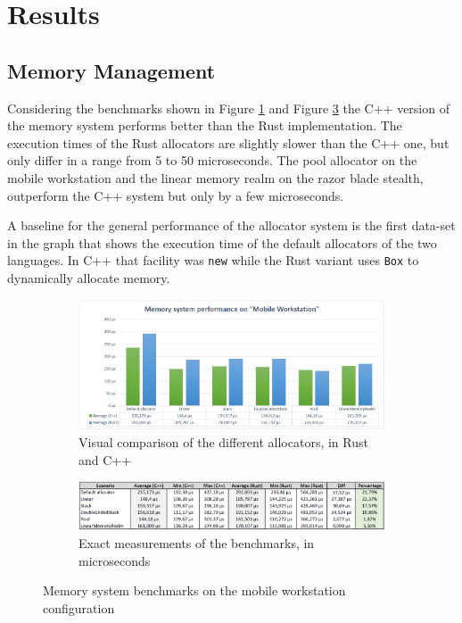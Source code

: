 \clearpage

\section{Results}

\subsection{Memory Management}

Considering the benchmarks shown in Figure \ref{fig:mem_bench_workstation} and Figure \ref{fig:mem_bench_blade} the C++ version of the memory system performs better than the Rust implementation. The execution times of the Rust allocators are slightly slower than the C++ one, but only differ in a range from 5 to 50 microseconds. The pool allocator on the mobile workstation and the linear memory realm on the razor blade stealth, outperform the C++ system but only by a few microseconds. 

A baseline for the general performance of the allocator system is the first data-set in the graph that shows the execution time of the default allocators of the two languages. In C++ that facility was \texttt{new} while the Rust variant uses \texttt{Box} to dynamically allocate memory.

\begin{figure}[h!]
	\centering
	\begin{subfigure}[b]{\textwidth}
		\includegraphics[width=1\linewidth]{PICs/mem_bench_workstation.png}
		\caption{Visual comparison of the different allocators, in Rust and C++}
		\label{fig:mem_bench_workstation} 
	\end{subfigure}
	
	\begin{subfigure}[b]{\textwidth}
		\includegraphics[width=1\linewidth]{PICs/mem_bench_workstation_data.png}
		\caption{Exact measurements of the benchmarks, in microseconds}
		\label{fig:mem_bench_blade}
	\end{subfigure}
	
	\caption[Memory benchmarks workstation]{Memory system benchmarks on the mobile workstation configuration}
\end{figure}

